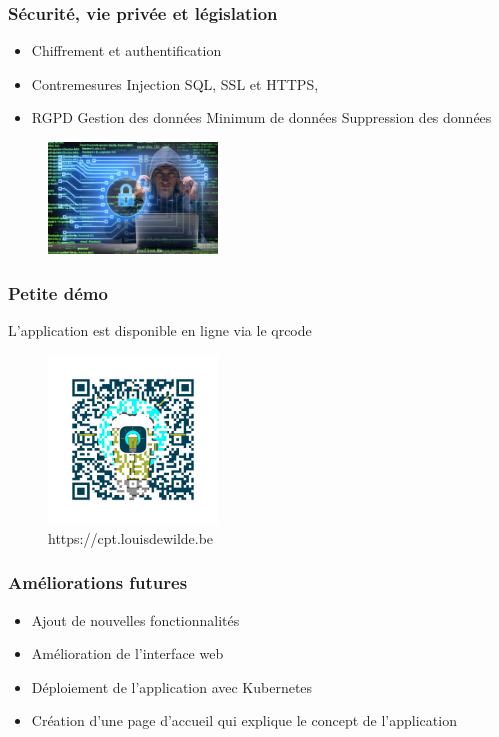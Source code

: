 \documentclass[aspectratio=169]{beamer}
\begin{document}
    \begin{frame}
        \frametitle{Sécurité, vie privée et législation}
        \begin{itemize}
            \item Chiffrement et authentification
            \item Contremesures
            \subitem Injection SQL,
            \subitem SSL et HTTPS,
            \item RGPD
            \subitem Gestion des données
            \subitem Minimum de données
            \subitem Suppression des données
        \end{itemize}
        \begin{figure}[h]
            \centering
            \includegraphics[width=0.4\textwidth]{imgs/young-hacker-cyber-securty-concept-260nw-1450697288}\label{fig:figure5}
        \end{figure}

    \end{frame}

    \begin{frame}
        \frametitle{Petite démo}
        L'application est disponible en ligne via le qrcode
        \begin{figure}[h]
            \centering
            \includegraphics[width=0.4\textwidth]{imgs/QRcode_C3 (1)}\caption{https://cpt.louisdewilde.be}\label{fig:figure2}
        \end{figure}
    \end{frame}

    \begin{frame}
        \frametitle{Améliorations futures}
        \begin{itemize}
            \item Ajout de nouvelles fonctionnalités
            \item Amélioration de l'interface web
            \item Déploiement de l'application avec Kubernetes
            \item Création d'une page d'accueil qui explique le concept de l'application
        \end{itemize}
    \end{frame}
\end{document}
